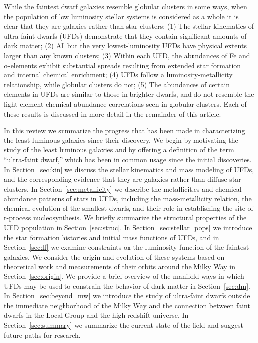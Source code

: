 \documentclass[a4paper]{ar-1col}
\begin{document}
While the faintest dwarf galaxies resemble globular clusters in some
ways, when the population of low luminosity stellar systems is
considered as a whole it is clear that they are galaxies rather than
star clusters: (1) The stellar kinematics of ultra-faint dwarfs (UFDs)
demonstrate that they contain significant amounts of dark matter; (2)
All but the very lowest-luminosity UFDs have physical extents larger
than any known clusters; (3) Within each UFD, the abundances of Fe and
$\alpha$-elements exhibit substantial spreads resulting from extended
star formation and internal chemical enrichment; (4) UFDs follow a
luminosity-metallicity relationship, while globular clusters do not;
(5) The abundances of certain elements in UFDs are similar to those in
brighter dwarfs, and do not resemble the light element chemical
abundance correlations seen in globular clusters.  Each of these
results is discussed in more detail in the remainder of this article.

In this review we summarize the progress that has been made in
characterizing the least luminous galaxies since their discovery.  We
begin by motivating the study of the least luminous galaxies and by
offering a definition of the term ``ultra-faint dwarf,'' which has
been in common usage since the initial discoveries.  In
Section~\ref{sec:kin} we discuss the stellar kinematics and mass
modeling of UFDs, and the corresponding evidence that they are
galaxies rather than diffuse star clusters.  In
Section~\ref{sec:metallicity} we describe the metallicities and
chemical abundance patterns of stars in UFDs, including the
mass-metallicity relation, the chemical evolution of the smallest
dwarfs, and their role in establishing the site of r-process
nucleosynthesis.  We briefly summarize the structural properties of
the UFD population in Section~\ref{sec:struc}.  In
Section~\ref{sec:stellar_pops} we introduce the star formation
histories and initial mass functions of UFDs, and in
Section~\ref{sec:lf} we examine constraints on the luminosity function
of the faintest galaxies.  We consider the origin and evolution of
these systems based on theoretical work and measurements of their
orbits around the Milky Way in Section~\ref{sec:origin}.  We provide a
brief overview of the manifold ways in which UFDs may be used to
constrain the behavior of dark matter in Section~\ref{sec:dm}.  In
Section~\ref{sec:beyond_mw} we introduce the study of ultra-faint
dwarfs outside the immediate neighborhood of the Milky Way and the
connection between faint dwarfs in the Local Group and the
high-redshift universe.  In Section~\ref{sec:summary} we summarize the
current state of the field and suggest future paths for research.
\end{document}

